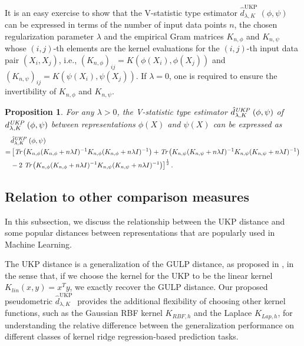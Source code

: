 \documentclass[11pt]{article}
\newcommand{\repone}{\phi}
\newcommand{\reptwo}{\psi}
\newcommand{\metricstname}{UKP }
\theoremstyle{plain}
\newcounter{propositionno}
\newtheorem{proposition}[propositionno]{Proposition}
\begin{document}
It is an easy exercise to show that the V-statistic type estimator $\hat{d}_{\lambda,K}^{\text{\metricstname}}(\repone,\reptwo)$ can be expressed in terms of the number of input data points $n$, the chosen regularization parameter $\lambda$ and the empirical Gram matrices $K_{n,\repone}$ and $K_{n,\reptwo}$ whose $(i,j)$-th elements are the kernel evaluations for the $(i,j)$-th input data pair $(X_{i},X_{j})$, i.e., $\left(K_{n,\repone}\right)_{ij} = K(\repone(X_{i}),\repone(X_{j}))$ and $\left(K_{n,\reptwo}\right)_{ij} = K(\reptwo(X_{i}),\reptwo(X_{j}))$. If $\lambda=0$, one is required to ensure the invertibility of $K_{n,\repone}$ and $K_{n,\reptwo}$.

\begin{proposition}\label{Proposition: Estimator in terms of Gram matrices}
    For any $\lambda>0$, the V-statistic type estimator $\hat{d}_{\lambda,K}^{\emph{\metricstname}}(\repone,\reptwo)$ of  $d_{\lambda,K}^{\emph{\metricstname}}(\repone,\reptwo)$ between representations $\repone(X)$ and $\reptwo(X)$ can be expressed as
    \[
    \begin{aligned}
        &\hat{d}_{\lambda,K}^{\emph{\metricstname}}(\repone,\reptwo)\\
        =& \left[\emph{Tr}\left(K_{n,\repone}(K_{n,\repone}+n\lambda I)^{-1}K_{n,\repone}(K_{n,\repone}+n\lambda I)^{-1}\right) + \emph{Tr}\left(K_{n,\reptwo}(K_{n,\reptwo}+n\lambda I)^{-1}K_{n,\reptwo}(K_{n,\reptwo}+n\lambda I)^{-1}\right)\right.\\
        &-2\left.\emph{Tr}\left(K_{n,\repone}(K_{n,\repone}+n\lambda I)^{-1}K_{n,\reptwo}(K_{n,\reptwo}+n\lambda I)^{-1}\right)\right]^{\frac{1}{2}}.
    \end{aligned}
    \]
\end{proposition}
 
\subsection{Relation to other comparison measures} 
\label{Relation to other comparison measures}

In this subsection, we discuss the relationship between the \metricstname distance and some popular distances between representations that are popularly used in Machine Learning.

The \metricstname distance is a generalization of the GULP distance, as proposed in \citet{GULP}, in the sense that, if we choose the kernel for the \metricstname to be the linear kernel $K_{lin}(x,y) = x^{T}y$, we exactly recover the GULP distance. Our proposed pseudometric $\hat{d}_{\lambda,K}^{\text{\metricstname}}$ provides the additional flexibility of choosing other kernel functions, such as the Gaussian RBF kernel $K_{RBF,h}$ and the Laplace $K_{Lap,h}$, for understanding the relative difference between the generalization performance on different classes of kernel ridge regression-based prediction tasks. 
\end{document}
